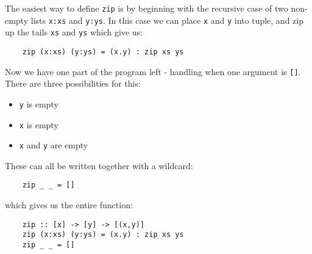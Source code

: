 The easiest way to define \verb|zip| is by beginning with the recursive case of two non-empty lists \verb|x:xs| and \verb|y:ys|. In this case we can place \verb|x| and \verb|y| into tuple, and zip up the tails \verb|xs| and \verb|ys| which give us:
\begin{verbatim}
    zip (x:xs) (y:ys) = (x.y) : zip xs ys
\end{verbatim}
Now we have one part of the program left - handling when one argument is \verb|[]|. There are three possibilities for this:
\begin{itemize}
    \item \verb|y| is empty
    \item \verb|x| is empty
    \item \verb|x| and \verb|y| are empty
\end{itemize}
These can all be written together with a wildcard:
\begin{verbatim}
    zip _ _ = []
\end{verbatim}
which gives us the entire function:
\begin{verbatim}
    zip :: [x] -> [y] -> [(x,y)]
    zip (x:xs) (y:ys) = (x.y) : zip xs ys
    zip _ _ = []
\end{verbatim}
